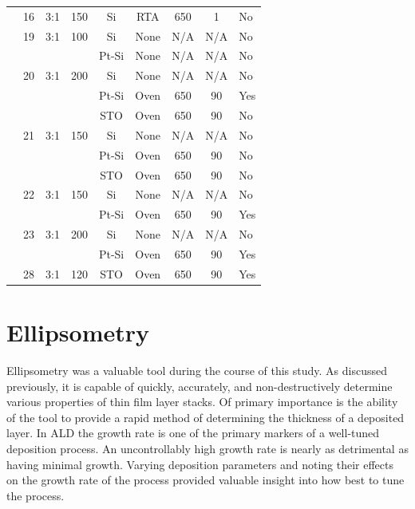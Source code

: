 {\begin{longtable}{cccccccc}
		&16		&3:1		&150	&Si		&RTA	&650	&1		&No\\
		&19		&3:1		&100	&Si		&None 	&N/A		&N/A		&No\\
		&		&		&		&Pt-Si	&None 	&N/A		&N/A		&No\\
		&20		&3:1		&200	&Si		&None 	&N/A		&N/A		&No\\
		&		&		&		&Pt-Si	&Oven	&650	&90		&Yes\\
		&		&		&		&STO	&Oven	&650	&90		&No\\
		&21		&3:1		&150	&Si		&None 	&N/A		&N/A		&No\\
		&		&		&		&Pt-Si	&Oven	&650	&90		&No\\
		&		&		&		&STO	&Oven	&650	&90		&No\\
		&22		&3:1		&150	&Si		&None 	&N/A		&N/A		&No\\
		&		&		&		&Pt-Si	&Oven	&650	&90		&Yes\\
		&23		&3:1		&200	&Si		&None 	&N/A		&N/A		&No\\
		&		&		&		&Pt-Si	&Oven	&650	&90		&Yes\\
		&28		&3:1		&120	&STO	&Oven	&650	&90		&Yes\\
	\bottomrule
\end{longtable}}


\section{Ellipsometry}
\label{chap:Results-Ellipsometry}

Ellipsometry was a valuable tool during the course of this study. As discussed previously, it is capable of quickly, accurately, and non-destructively determine various properties of thin film layer stacks. Of primary importance is the ability of the tool to provide a rapid method of determining the thickness of a deposited layer. In ALD the growth rate is one of the primary markers of a well-tuned deposition process. An uncontrollably high growth rate is nearly as detrimental as having minimal growth. Varying deposition parameters and noting their effects on the growth rate of the process provided valuable insight into how best to tune the process. 

